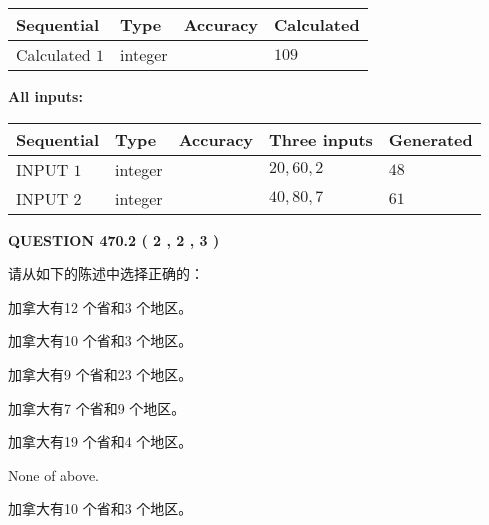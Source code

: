 \documentclass{ctexart}
\begin{document}
  
\noindent\begin{tabular}{|l|l|l|l|}
\hline
 Sequential & Type & Accuracy & Calculated \\ 
\hline
 
 
  Calculated $  1 $ & integer &  & 
  $ 109 $ 
 \\  \hline  
 \end{tabular}
   
   
   
   
\noindent\vspace{0.1in}\hspace{-0.08in} {\textbf{\Large{All inputs: }}}
   
   
  
  
\noindent\begin{tabular}{|l|l|l|l|l|}
\hline
 Sequential & Type & Accuracy & Three inputs & Generated \\ 
\hline
 
 
  INPUT $  1 $ & integer &  & $
 20
 , 
 60
 , 
 2
 $ & $ 48 $ 
 \\  \hline  
 
 
  INPUT $  2 $ & integer &  & $
 40
 , 
 80
 , 
 7
 $ & $ 61 $ 
 \\  \hline  
 \end{tabular}
   
   
  
\vspace{0.2in}
  
{\textbf{\Large{QUESTION
470.2 
 ( 2 , 2 , 3 )
}}}
  
  
请从如下的陈述中选择正确的：
 
 
加拿大有12 个省和3 个地区。
 
 
加拿大有10 个省和3 个地区。
 
 
加拿大有9 个省和23 个地区。
 
 
加拿大有7 个省和9 个地区。
 
 
加拿大有19 个省和4 个地区。
 
 
 None of above.
 
 
\noindent{}
 
 
加拿大有10 个省和3 个地区。
 
 
\noindent{}
 
\end{document}
